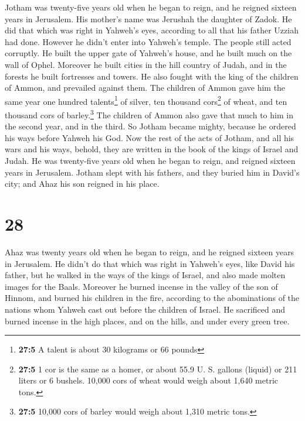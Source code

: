  Jotham was twenty-five years old when he began to reign,
and he reigned sixteen years in Jerusalem. His mother's name was
Jerushah the daughter of Zadok.  He did that which was
right in Yahweh's eyes, according to all that his father Uzziah had
done. However he didn't enter into Yahweh's temple. The people still
acted corruptly.  He built the upper gate of Yahweh's
house, and he built much on the wall of Ophel.  Moreover
he built cities in the hill country of Judah, and in the forests he
built fortresses and towers.  He also fought with the king
of the children of Ammon, and prevailed against them. The children of
Ammon gave him the same year one hundred talents\footnote{\textbf{27:5}
  A talent is about 30 kilograms or 66 pounds} of silver, ten thousand
cors\footnote{\textbf{27:5} 1 cor is the same as a homer, or about 55.9
  U. S. gallons (liquid) or 211 liters or 6 bushels. 10,000 cors of
  wheat would weigh about 1,640 metric tons.} of wheat, and ten thousand
cors of barley.\footnote{\textbf{27:5} 10,000 cors of barley would weigh
  about 1,310 metric tons.} The children of Ammon also gave that much to
him in the second year, and in the third.  So Jotham
became mighty, because he ordered his ways before Yahweh his God.
 Now the rest of the acts of Jotham, and all his wars and
his ways, behold, they are written in the book of the kings of Israel
and Judah.  He was twenty-five years old when he began to
reign, and reigned sixteen years in Jerusalem.  Jotham
slept with his fathers, and they buried him in David's city; and Ahaz
his son reigned in his place.

\hypertarget{section-27}{%
\section{28}\label{section-27}}

 Ahaz was twenty years old when he began to reign, and he
reigned sixteen years in Jerusalem. He didn't do that which was right in
Yahweh's eyes, like David his father,  but he walked in
the ways of the kings of Israel, and also made molten images for the
Baals.  Moreover he burned incense in the valley of the
son of Hinnom, and burned his children in the fire, according to the
abominations of the nations whom Yahweh cast out before the children of
Israel.  He sacrificed and burned incense in the high
places, and on the hills, and under every green tree.

